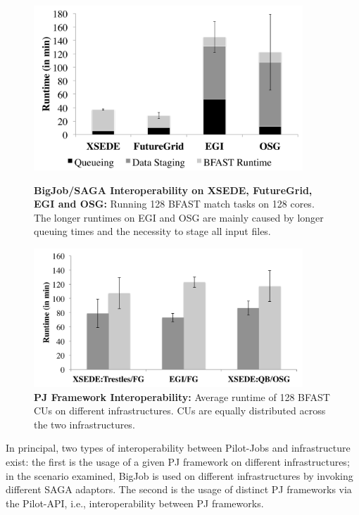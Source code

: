 \documentclass[]{paper}
\begin{document}
\begin{figure} [t]
	\begin{minipage}[t]{0.48\textwidth}
	\centering 
	\includegraphics[width=0.9\textwidth]{figures/128-bfast-egi-fg-xsede-osg.pdf}
	\caption{\textbf{BigJob/SAGA Interoperability on XSEDE, FutureGrid, EGI and 
	  OSG:} Running 128 BFAST match tasks on 128 cores. The longer runtimes on EGI 
	  and OSG are mainly caused by  longer queuing times and the necessity to      
	  stage all input files.}
	  \label{fig:perf_perf-bfast-bj}
	\end{minipage}\hspace{2mm}
	\begin{minipage}[t]{0.48\textwidth}
	  	\centering
	\includegraphics[width=0.9\textwidth]{figures/128-bfast-interop-with-staging.pdf}
		\caption{\textbf{PJ Framework Interoperability:} Average runtime of
	          128 BFAST CUs on different infrastructures. CUs are
	          equally distributed across the two infrastructures.}
		\label{fig:perf_interop_128-bfast-interop}
	\end{minipage}

\end{figure}


In principal, two types of interoperability between Pilot-Jobs and
infrastructure exist: the first is the usage of a given PJ framework on
different infrastructures; in the scenario examined, BigJob is used on
different infrastructures by invoking different SAGA adaptors. The second is
the usage of distinct PJ frameworks via the Pilot-API, i.e., interoperability
between PJ frameworks. 
\end{document}
